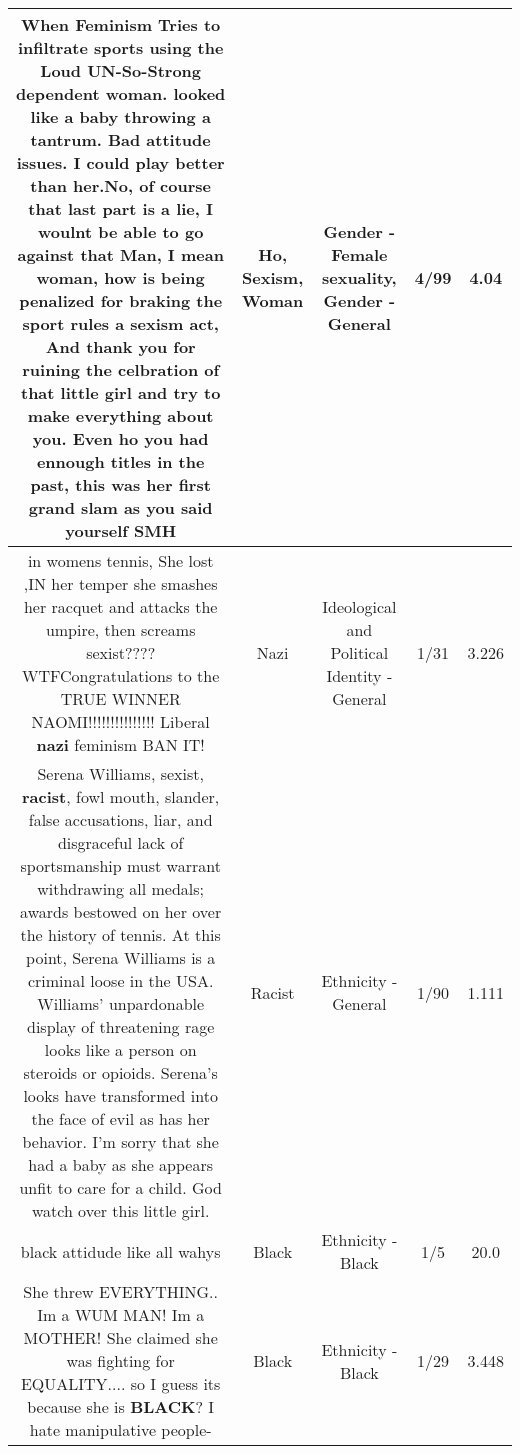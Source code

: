 \documentclass[11pt]{article}
\newlength\mylength
\begin{document}
\begin{center}
\begin{longtable}{|C{.65\mylength}|C{.30\mylength}|C{.12\mylength}|C{.12\mylength}|C{.12\mylength}|}
  \small When Feminism Tries to infiltrate sports using the Loud UN-So-Strong dependent \textbf{woman}. looked like a baby throwing a tantrum. Bad attitude issues. I could play better than her.No, of course that last part is a lie, I woulnt be able to go against that Man, I mean \textbf{woman}, how is being penalized for braking the sport rules a \textbf{sexism} act, And thank you for ruining the celbration of that little girl and try to make everything about you. Even \textbf{ho} you had ennough titles in the past, this was her first grand slam as you said yourself SMH\normalsize   & Ho, Sexism, Woman & Gender - Female sexuality, Gender - General & 4/99 & 4.04 \\  \hline
  \small in womens tennis, She lost ,IN her  temper  she smashes her racquet and attacks the umpire, then  screams sexist???? WTFCongratulations to the TRUE WINNER NAOMI!!!!!!!!!!!!!!! Liberal \textbf{nazi} feminism BAN IT!\normalsize   & Nazi &  Ideological and Political Identity - General & 1/31 & 3.226 \\  \hline
  \small Serena Williams, sexist, \textbf{racist}, fowl mouth, slander, false accusations, liar, and disgraceful lack of sportsmanship must warrant withdrawing all medals; awards bestowed on her over the history of tennis. At this point, Serena Williams is a criminal loose in the USA. Williams' unpardonable display of threatening rage looks like a person on steroids or opioids. Serena's looks have transformed into the face of evil as has her behavior. I'm sorry that she had a baby as she appears unfit  to care for a child. God watch over this little   girl.\normalsize   & Racist & Ethnicity - General & 1/90 & 1.111 \\  \hline
  \small black attidude  like all wahys\normalsize   & Black & Ethnicity - Black & 1/5 & 20.0 \\  \hline
  \small She threw EVERYTHING..  Im a WUM MAN!   Im a MOTHER! She claimed she was fighting for EQUALITY.... so I guess its because she is \textbf{BLACK}?  I hate manipulative people-\normalsize   & Black & Ethnicity - Black & 1/29 & 3.448 \\  \hline

\end{longtable}
\end{center}
\end{document}
